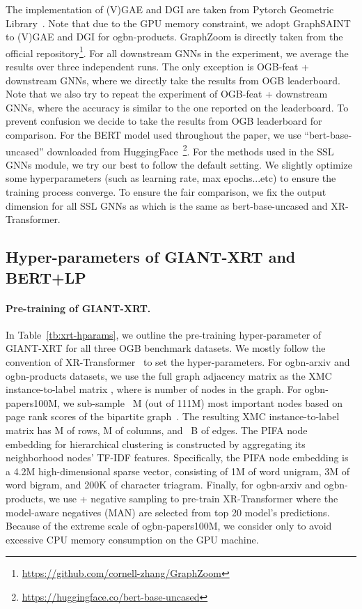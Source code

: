 \documentclass{article} \usepackage{iclr2022_conference,times}
\begin{document}
The implementation of (V)GAE and DGI are taken from Pytorch Geometric Library~\citep{fey2019fast}. Note that due to the GPU memory constraint, we adopt GraphSAINT~\citep{graphsaint-iclr20} to (V)GAE and DGI for ogbn-products. GraphZoom is directly taken from the official repository\footnote{\url{https://github.com/cornell-zhang/GraphZoom}}. For all downstream GNNs in the experiment, we average the results over three independent runs. The only exception is OGB-feat + downstream GNNs, where we directly take the results from OGB leaderboard. Note that we also try to repeat the experiment of OGB-feat + downstream GNNs, where the accuracy is similar to the one reported on the leaderboard. To prevent confusion we decide to take the results from OGB leaderboard for comparison. For the BERT model used throughout the paper, we use ``bert-base-uncased'' downloaded from HuggingFace~\footnote{\url{https://huggingface.co/bert-base-uncased}}. For the methods used in the SSL GNNs module, we try our best to follow the default setting. We slightly optimize some hyperparameters (such as learning rate, max epochs...etc) to ensure the training process converge. To ensure the fair comparison, we fix the output dimension for all SSL GNNs as  which is the same as bert-base-uncased and XR-Transformer.

\subsection{Hyper-parameters of GIANT-XRT and BERT+LP}
\label{apx:hparams-giant-xrt}

\paragraph{Pre-training of GIANT-XRT.}
In Table~\ref{tb:xrt-hparams}, we outline the pre-training hyper-parameter of GIANT-XRT for all three OGB benchmark datasets.
We mostly follow the convention of XR-Transformer~\citep{jiong2021fast} to set the hyper-parameters.
For ogbn-arxiv and ogbn-products datasets, we use the full graph adjacency matrix as the XMC instance-to-label matrix , where  is number of nodes in the graph.
For ogbn-papers100M, we sub-sample ~M (out of 111M) most important nodes based on page rank scores of the bipartite graph~\citep{he2016birank}.
The resulting XMC instance-to-label matrix  has M of rows, M of columns, and ~B of edges.
The PIFA node embedding for hierarchical clustering is constructed by aggregating its neighborhood nodes' TF-IDF features.
Specifically, the PIFA node embedding is a 4.2M high-dimensional sparse vector, consisting of 1M of word unigram, 3M of word bigram, and 200K of character triagram. 
Finally, for ogbn-arxiv and ogbn-products, we use + negative sampling to pre-train XR-Transformer where the model-aware negatives (MAN) are selected from top 20 model's predictions.
Because of the extreme scale of ogbn-papers100M, we consider  only to avoid excessive CPU memory consumption on the GPU machine.
\end{document}
